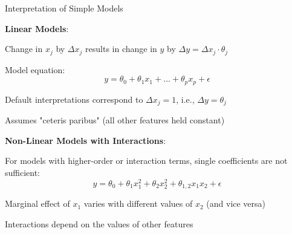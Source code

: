 \documentclass[10pt,compress,t,notes=noshow, xcolor=table]{beamer}
\begin{document}



\begin{framei}[align=top]{Interpretation of Simple Models}
\item \textbf{Linear Models}:
\begin{itemizeS}
\item Change in $x_j$ by $\Delta x_j$ results in change in $y$ by $\Delta y = \Delta x_j \cdot \theta_j$
\item Model equation:
$$
y = \theta_0 + \theta_1 x_1 + \dots + \theta_p x_p + \epsilon
$$
\item Default interpretations correspond to $\Delta x_j = 1$, i.e., $\Delta y = \theta_j$
\item Assumes "ceteris paribus" (all other features held constant)
\end{itemizeS}
\pause
\item \textbf{Non-Linear Models with Interactions}:
\begin{itemizeS}
\item For models with higher-order or interaction terms, single coefficients are not sufficient:
$$
y = \theta_0 + \theta_{1} x_1^2 + \theta_{2} x_2^2 + \theta_{1,2} x_1 x_2 + \epsilon
$$
\item Marginal effect of $x_1$ varies with different values of $x_2$ (and vice versa)
\item Interactions depend on the values of other features
\end{itemizeS}
\end{framei}


\end{document}
